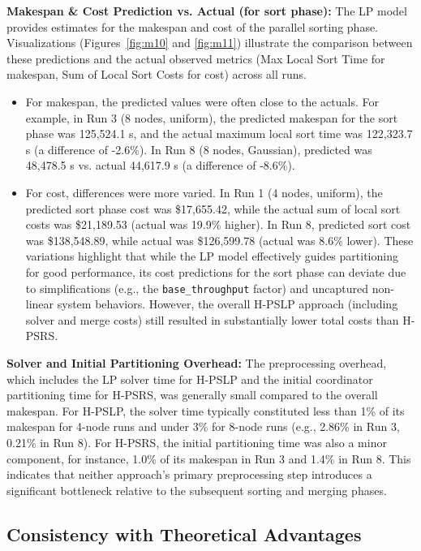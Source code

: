 \documentclass[]{interact}
\theoremstyle{plain}
\theoremstyle{definition}
\theoremstyle{remark}
\begin{document}
\textbf{Makespan \& Cost Prediction vs. Actual (for sort phase):} The LP model provides estimates for the makespan and cost of the parallel sorting phase. Visualizations (Figures~\ref{fig:m10} and \ref{fig:m11}) illustrate the comparison between these predictions and the actual observed metrics (Max Local Sort Time for makespan, Sum of Local Sort Costs for cost) across all runs.
\begin{itemize}
    \item For makespan, the predicted values were often close to the actuals. For example, in Run 3 (8 nodes, uniform), the predicted makespan for the sort phase was 125,524.1 \textmu{}s, and the actual maximum local sort time was 122,323.7 \textmu{}s (a difference of -2.6\%). In Run 8 (8 nodes, Gaussian), predicted was 48,478.5 \textmu{}s vs. actual 44,617.9 \textmu{}s (a difference of -8.6\%).
    \item For cost, differences were more varied. In Run 1 (4 nodes, uniform), the predicted sort phase cost was \$17,655.42, while the actual sum of local sort costs was \$21,189.53 (actual was 19.9\% higher). In Run 8, predicted sort cost was \$138,548.89, while actual was \$126,599.78 (actual was 8.6\% lower). These variations highlight that while the LP model effectively guides partitioning for good performance, its cost predictions for the sort phase can deviate due to simplifications (e.g., the \texttt{base\_throughput} factor) and uncaptured non-linear system behaviors. However, the overall H-PSLP approach (including solver and merge costs) still resulted in substantially lower total costs than H-PSRS.
\end{itemize}

\textbf{Solver and Initial Partitioning Overhead:} The preprocessing overhead, which includes the LP solver time for H-PSLP and the initial coordinator partitioning time for H-PSRS, was generally small compared to the overall makespan. For H-PSLP, the solver time typically constituted less than 1\% of its makespan for 4-node runs and under 3\% for 8-node runs (e.g., 2.86\% in Run 3, 0.21\% in Run 8). For H-PSRS, the initial partitioning time was also a minor component, for instance, 1.0\% of its makespan in Run 3 and 1.4\% in Run 8. This indicates that neither approach's primary preprocessing step introduces a significant bottleneck relative to the subsequent sorting and merging phases.

\subsection{Consistency with Theoretical Advantages}
\end{document}
